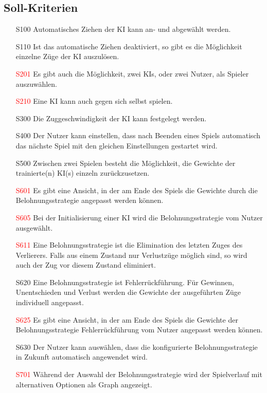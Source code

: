 \documentclass[titlepage]{scrartcl}
\begin{document}
\subsection{Soll-Kriterien}
	\begin{itemize}
		\item[S100] Automatisches Ziehen der KI kann an- und abgewählt werden.
		\item[S110] Ist das automatische Ziehen deaktiviert, so gibt es die Möglichkeit einzelne Züge der KI auszulösen.
		\item[\textcolor{red}{S201}] Es gibt auch die Möglichkeit, zwei KIs, oder zwei Nutzer, als Spieler auszuwählen.
		\item[\textcolor{red}{S210}] Eine KI kann auch gegen sich selbst spielen.
		\item[S300] Die Zuggeschwindigkeit der KI kann festgelegt werden. 
		\item[S400] Der Nutzer kann einstellen, dass nach Beenden eines Spiels automatisch das nächste Spiel mit den gleichen Einstellungen gestartet wird.
		\item[S500] Zwischen zwei Spielen besteht die Möglichkeit, die Gewichte der trainierte(n) KI(s) einzeln zurückzusetzen.
		\item[\textcolor{red}{S601}] Es gibt eine Ansicht, in der am Ende des Spiels die Gewichte durch die Belohnungsstrategie angepasst werden können.
		\item[\textcolor{red}{S605}] Bei der Initialisierung einer KI wird die Belohnungsstrategie vom Nutzer ausgewählt.
		\item[\textcolor{red}{S611}] Eine Belohnungsstrategie ist die Elimination des letzten Zuges des Verlierers. Falls aus einem Zustand nur Verlustzüge möglich sind, so wird auch der Zug vor diesem Zustand eliminiert.
		\item[S620] Eine Belohnungsstrategie ist Fehlerrückführung.
				Für Gewinnen, Unentschieden und Verlust werden die Gewichte der ausgeführten Züge individuell angepasst.
		\item[\textcolor{red}{S625}] Es gibt eine Ansicht, in der am Ende des Spiels die Gewichte der Belohnungsstrategie Fehlerrückführung vom Nutzer angepasst werden können.
		\item[S630] Der Nutzer kann auswählen, dass die konfigurierte Belohnungsstrategie in Zukunft automatisch angewendet wird.
		\item[\textcolor{red}{S701}] Während der Auswahl der Belohnungsstrategie wird der Spielverlauf mit alternativen Optionen als Graph angezeigt.
	\end{itemize}
\end{document}

